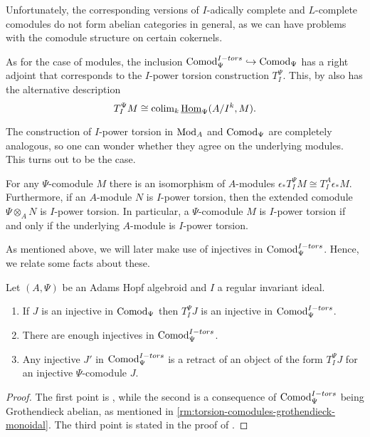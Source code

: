 \begin{remark}
    \label{rm:complete-comodules-not-abelian}
    Unfortunately, the corresponding versions of $I$-adically complete and $L$-complete comodules do not form abelian categories in general, as we can have problems with the comodule structure on certain cokernels.
\end{remark}

As for the case of modules, the inclusion $\mathrm{Comod}_\Psi^{I-tors}\hookrightarrow \mathrm{Comod}_\Psi$ has a right adjoint that corresponds to the $I$-power torsion construction $T_I^\Psi$. This, by \cite[5.5]{barthel-heard-valenzuela_2018} also has the alternative description
$$T_I^\Psi M \cong \operatorname{colim}_k \operatorname{\underline{Hom}}_\Psi (A/I^k, M).$$

The construction of $I$-power torsion in $\mathrm{Mod}_A$ and $\mathrm{Comod}_\Psi$ are completely analogous, so one can wonder whether they agree on the underlying modules. This turns out to be the case. 

\begin{lemma}
    \label{lm:torsion-comodule-iff-torsion-module}
    For any $\Psi$-comodule $M$ there is an isomorphism of $A$-modules $\epsilon_* T^\Psi_I M \cong T^A_I \epsilon_* M.$
    Furthermore, if an $A$-module $N$ is $I$-power torsion, then the extended comodule $\Psi\otimes_A N$ is $I$-power torsion. In particular, a $\Psi$-comodule $M$ is $I$-power torsion if and only if the underlying $A$-module is $I$-power torsion. 
\end{lemma}

As mentioned above, we will later make use of injectives in $\mathrm{Comod}_\Psi^{I-tors}$. Hence, we relate some facts about these. 

\begin{lemma}
    \label{lm:injectives-in-torsion-comodules}
    Let $(A, \Psi)$ be an Adams Hopf algebroid and $I$ a regular invariant ideal.
    \begin{enumerate}
        \item If $J$ is an injective in $\mathrm{Comod}_\Psi$ then $T_I^\Psi J$ is an injective in $\mathrm{Comod}_\Psi^{I-tors}$.
        \item There are enough injectives in $\mathrm{Comod}_\Psi^{I-tors}$.
        \item Any injective $J'$ in $\mathrm{Comod}_\Psi^{I-tors}$ is a retract of an object of the form $T_I^\Psi J$ for an injective $\Psi$-comodule $J$.
    \end{enumerate} 
\end{lemma}
\begin{proof}
    The first point is \cite[2.1.4]{brodmann-sharp_1998}, while the second is a consequence of $\mathrm{Comod}_\Psi^{I-tors}$ being Grothendieck abelian, as mentioned in \cref{rm:torsion-comodules-grothendieck-monoidal}. The third point is stated in the proof of \cite[3.16]{barthel-heard-valenzuela_2020}. 
\end{proof}


